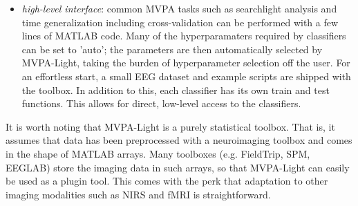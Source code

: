 \documentclass[utf8]{frontiersSCNS} %
\begin{document}
\begin{itemize}
\item \textit{high-level interface}: common MVPA tasks such as searchlight analysis and time generalization including cross-validation can be performed with a few lines of MATLAB code. Many of the hyperparamaters required by classifiers can be set to 'auto'; the parameters are then automatically selected by MVPA-Light, taking the burden of hyperparameter selection off the user. For an effortless start, a small EEG dataset and example scripts are shipped with the toolbox. In addition to this, each classifier has its own train and test functions. This allows for direct, low-level access to the classifiers. 
\end{itemize}

It is worth noting that MVPA-Light is a purely statistical toolbox. That is, it assumes that data has been preprocessed with a neuroimaging toolbox and comes in the shape of MATLAB arrays. Many toolboxes (e.g. FieldTrip, SPM, EEGLAB) store the imaging  data in such arrays, so that MVPA-Light can easily be used as a plugin tool. This comes with the perk that adaptation to other imaging modalities such as NIRS and fMRI is straightforward.



\end{document}

